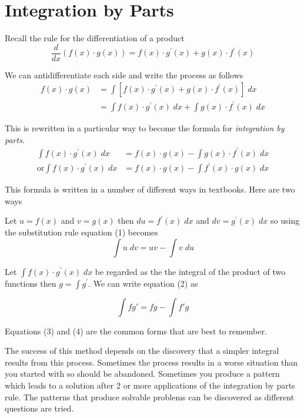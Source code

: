 \section{Integration by Parts}
Recall the rule for the differentiation of a product
\begin{equation*}\frac{d}{d x} \left (f (x) \cdot g (x)\right ) =f (x) \cdot g^{ \prime } (x) +g (x) \cdot f^{ \prime } (x)
\end{equation*}

We can antidifferentiate each side and write the process as follows
\begin{align*}f (x) \cdot g (x) &  = \int \left [f (x) \cdot g^{ \prime } (x) +g (x) \cdot f^{ \prime } (x)\right ]\; d x \\
 &  = \int f (x) \cdot g^{ \prime } (x)\; d x +\int g (x) \cdot f^{ \prime } (x)\; d x\end{align*}

This is rewritten in a particular way to become the formula for \emph{integration by parts}.
\begin{align}\int f (x) \cdot g^{ \prime } (x)\; d x &  = f (x) \cdot g (x) -\int g (x) \cdot f^{ \prime } (x)\; d x \tag{1} \\
\text{or}\int f (x) \cdot g^{ \prime } (x)\; d x &  = f (x) \cdot g (x) -\int f^{ \prime } (x) \cdot g (x)\; d x \tag{2}\end{align}

This formula is written in a number of different ways in textbooks. Here
are two ways 

Let $u =f (x)$ and $v =g (x)$ then $d u =f^{ \prime } (x)\; d x$ and $d v =g^{ \prime } (x)\; d x$ so using the substitution rule equation (1) becomes
\begin{equation}\int u\; d v =u v -\int v\; d u\tag{3}
\end{equation}

Let $\int f (x) \cdot g^{ \prime } (x)\; d x$ be regarded as the the integral of the product of two functions then $g =\int g^{ \prime }$. We can write equation (2) as
\begin{tcolorbox}
	\[\int fg'=fg-\int f'g \tag{4}\]
\end{tcolorbox}
Equations (3) and (4) are the common forms that are best to remember.

The success of this method depends on the discovery that a simpler integral results from this process. Sometimes the process results in a worse situation than you started with so should be abandoned. Sometimes you produce a pattern which leads to a solution after 2 or more applications of the integration by parts rule. The patterns that produce solvable problems can be discovered as different questions are tried. 

